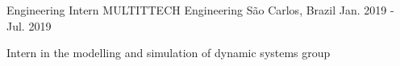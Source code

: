\begin{cventries}
  \cventry
    {Engineering Intern} %
    {MULTITTECH Engineering} %
    {São Carlos, Brazil} %
    {Jan. 2019 - Jul. 2019} %
    {
      \begin{cvitems} %
        \item {Intern in the modelling and simulation of dynamic systems group}
      \end{cvitems}
      }
      

\end{cventries}
